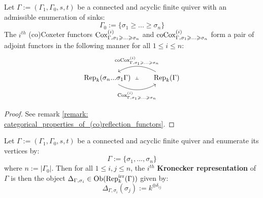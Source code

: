             \begin{lemma} \label{lemma: coxeter_functors_are_adjoints}
                Let $\Gamma := (\Gamma_1, \Gamma_0, s, t)$ be a connected and acyclic finite quiver with an admissible enumeration of sinks:
                    $$\Gamma_0 := \{\sigma_1 \geq ... \geq \sigma_n\}$$
                The $i^{th}$ (co)Coxeter functors $\mathrm{Cox}^{(i)}_{\Gamma, \sigma_1 \geqslant ...\geqslant \sigma_n}$ and $\mathrm{co}\mathrm{Cox}^{(i)}_{\Gamma, \sigma_1 \geqslant ...\geqslant \sigma_n}$ form a pair of adjoint functors in the following manner for all $1 \leq i \leq n$:
                    $$
                        \begin{tikzcd}
                        	{\Rep_k(\sigma_n ... \sigma_1\Gamma)} & {\Rep_k(\Gamma)}
                        	\arrow[""{name=0, anchor=center, inner sep=0}, "{\Cox^{(i)}_{\Gamma, \sigma_1 \geq ...\geq \sigma_n}}"', bend right, from=1-1, to=1-2]
                        	\arrow[""{name=1, anchor=center, inner sep=0}, "{\co\Cox^{(i)}_{\Gamma, \sigma_1 \geq ...\geq \sigma_n}}"', bend right, from=1-2, to=1-1]
                        	\arrow["\dashv"{anchor=center, rotate=-90}, draw=none, from=1, to=0]
                        \end{tikzcd}
                    $$
            \end{lemma}
                \begin{proof}
                    See remark \ref{remark: categorical_properties_of_(co)reflection_functors}.
                \end{proof}
            \begin{convention} \label{conv: kronecker_representations}
                Let $\Gamma := (\Gamma_1, \Gamma_0, s, t)$ be a connected and acyclic finite quiver and enumerate its vertices by:
                    $$\Gamma := \{\sigma_1, ..., \sigma_n\}$$
                where $n := |\Gamma_0|$. Then for all $1 \leq i, j \leq n$, the $i^{th}$ \textbf{Kronecker representation} of $\Gamma$ is then the object $\Delta_{\Gamma, \sigma_i} \in \mathrm{Ob}(\mathrm{Rep}_k^{\mathrm{irr}}(\Gamma))$ given by:
                    $$\Delta_{\Gamma, \sigma_i}(\sigma_j) := k^{\oplus \delta_{ij}}$$
            \end{convention}
